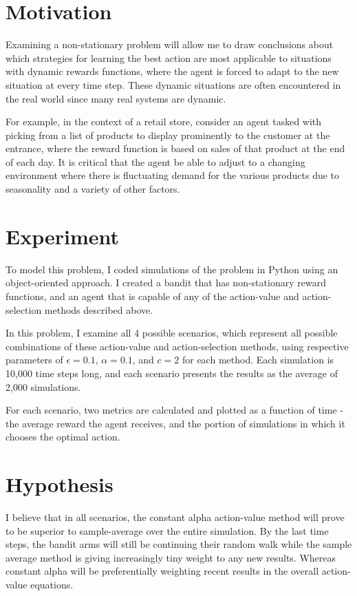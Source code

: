 \documentclass{article}
\begin{document}
\section{Motivation}
Examining a non-stationary problem will allow me to draw conclusions about which strategies for learning the best action are most applicable to situations with dynamic rewards functions, where the agent is forced to adapt to the new situation at every time step. These dynamic situations are often encountered in the real world since many real systems are dynamic. 

For example, in the context of a retail store, consider an agent tasked with picking from a list of products to display prominently to the customer at the entrance, where the reward function is based on sales of that product at the end of each day. It is critical that the agent be able to adjust to a changing environment where there is fluctuating demand for the various products due to seasonality and a variety of other factors.


\section{Experiment}
To model this problem, I coded simulations of the problem in Python using an object-oriented approach. I created a bandit that has non-stationary reward functions, and an agent that is capable of any of the action-value and action-selection methods described above.

In this problem, I examine all 4 possible scenarios, which represent all possible combinations of these action-value and action-selection methods, using respective parameters of $\epsilon=0.1$, $\alpha=0.1$, and $c=2$ for each method. Each simulation is 10,000 time steps long, and each scenario presents the results as the average of 2,000 simulations.

For each scenario, two metrics are calculated and plotted as a function of time - the average reward the agent receives, and the portion of simulations in which it chooses the optimal action.

\section{Hypothesis}
I believe that in all scenarios, the constant alpha action-value method will prove to be superior to sample-average over the entire simulation. By the last time steps, the bandit arms will still be continuing their random walk while the sample average method is giving increasingly tiny weight to any new results. Whereas constant alpha will be preferentially weighting recent results in the overall action-value equations.
\end{document}
